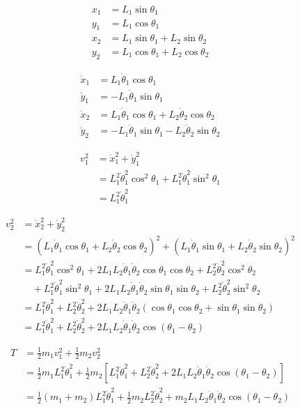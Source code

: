 \documentclass[10pt]{article}
\begin{document}
\tiny

\begin{align*}
x_1 &= L_1 \sin\theta_1 \\
y_1 &= L_1 \cos\theta_1 \\
x_2 &= L_1 \sin\theta_1 + L_2 \sin\theta_2 \\
y_2 &= L_1 \cos\theta_1 + L_2 \cos\theta_2
\end{align*}

\begin{align*}
\dot{x}_1 &= L_1 \dot{\theta}_1 \cos\theta_1 \\
\dot{y}_1 &= -L_1 \dot{\theta}_1 \sin\theta_1 \\
\dot{x}_2 &= L_1 \dot{\theta}_1 \cos\theta_1 + L_2 \dot{\theta}_2 \cos\theta_2 \\
\dot{y}_2 &= -L_1 \dot{\theta}_1 \sin\theta_1 - L_2 \dot{\theta}_2 \sin\theta_2
\end{align*}

\begin{align*}
v_1^2 &= \dot{x}_1^2 + \dot{y}_1^2 \\
&= L_1^2 \dot{\theta}_1^2 \cos^2\theta_1 + L_1^2 \dot{\theta}_1^2 \sin^2\theta_1 \\
&= L_1^2 \dot{\theta}_1^2
\end{align*}

\begin{align*}
v_2^2 &= \dot{x}_2^2 + \dot{y}_2^2 \\
&= (L_1 \dot{\theta}_1 \cos\theta_1 + L_2 \dot{\theta}_2 \cos\theta_2)^2 + (L_1 \dot{\theta}_1 \sin\theta_1 + L_2 \dot{\theta}_2 \sin\theta_2)^2 \\
&= L_1^2 \dot{\theta}_1^2 \cos^2\theta_1 + 2L_1 L_2 \dot{\theta}_1 \dot{\theta}_2 \cos\theta_1 \cos\theta_2 + L_2^2 \dot{\theta}_2^2 \cos^2\theta_2 \\
&\quad + L_1^2 \dot{\theta}_1^2 \sin^2\theta_1 + 2L_1 L_2 \dot{\theta}_1 \dot{\theta}_2 \sin\theta_1 \sin\theta_2 + L_2^2 \dot{\theta}_2^2 \sin^2\theta_2 \\
&= L_1^2 \dot{\theta}_1^2 + L_2^2 \dot{\theta}_2^2 + 2L_1 L_2 \dot{\theta}_1 \dot{\theta}_2 (\cos\theta_1 \cos\theta_2 + \sin\theta_1 \sin\theta_2) \\
&= L_1^2 \dot{\theta}_1^2 + L_2^2 \dot{\theta}_2^2 + 2L_1 L_2 \dot{\theta}_1 \dot{\theta}_2 \cos(\theta_1 - \theta_2)
\end{align*}

\begin{align*}
T &= \frac{1}{2} m_1 v_1^2 + \frac{1}{2} m_2 v_2^2 \\
&= \frac{1}{2} m_1 L_1^2 \dot{\theta}_1^2 + \frac{1}{2} m_2 \left[ L_1^2 \dot{\theta}_1^2 + L_2^2 \dot{\theta}_2^2 + 2L_1 L_2 \dot{\theta}_1 \dot{\theta}_2 \cos(\theta_1 - \theta_2) \right] \\
&= \frac{1}{2}(m_1 + m_2) L_1^2 \dot{\theta}_1^2 + \frac{1}{2} m_2 L_2^2 \dot{\theta}_2^2 + m_2 L_1 L_2 \dot{\theta}_1 \dot{\theta}_2 \cos(\theta_1 - \theta_2)
\end{align*}
\end{document}
